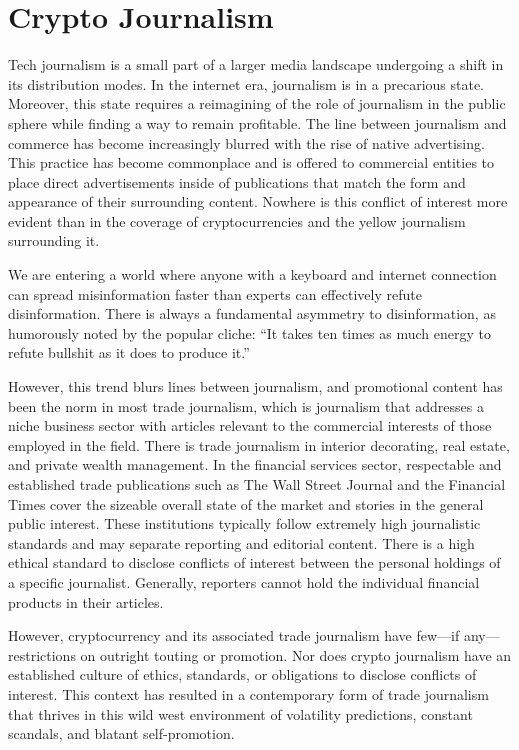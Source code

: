 \chapter{Crypto Journalism}


Tech journalism is a small part of a larger media landscape undergoing a shift
in its distribution modes. In the internet era, journalism is in a precarious
state. Moreover, this state requires a reimagining of the role of journalism in
the public sphere while finding a way to remain profitable. The line between
journalism and commerce has become increasingly blurred with the rise of native
advertising. This practice has become commonplace and is offered to commercial
entities to place direct advertisements inside of publications that match the
form and appearance of their surrounding content. Nowhere is this conflict of
interest more evident than in the coverage of cryptocurrencies and the yellow
journalism surrounding it.


We are entering a world where anyone with a keyboard and internet connection can
spread misinformation faster than experts can effectively refute disinformation.
There is always a fundamental asymmetry to disinformation, as humorously noted
by the popular cliche: ``It takes ten times as much energy to refute bullshit as
it does to produce it.''

However, this trend blurs lines between journalism, and promotional content has
been the norm in most trade journalism, which is journalism that addresses a
niche business sector with articles relevant to the commercial interests of
those employed in the field. There is trade journalism in interior decorating,
real estate, and private wealth management. In the financial services sector,
respectable and established trade publications such as The Wall Street Journal
and the Financial Times cover the sizeable overall state of the market and
stories in the general public interest. These institutions typically follow
extremely high journalistic standards and may separate reporting and editorial
content. There is a high ethical standard to disclose conflicts of interest
between the personal holdings of a specific journalist. Generally, reporters
cannot hold the individual financial products in their articles.

However, cryptocurrency and its associated trade journalism have few—if
any—restrictions on outright touting or promotion. Nor does crypto journalism
have an established culture of ethics, standards, or obligations to disclose
conflicts of interest. This context has resulted in a contemporary form of trade
journalism that thrives in this wild west environment of volatility predictions,
constant scandals, and blatant self-promotion.

